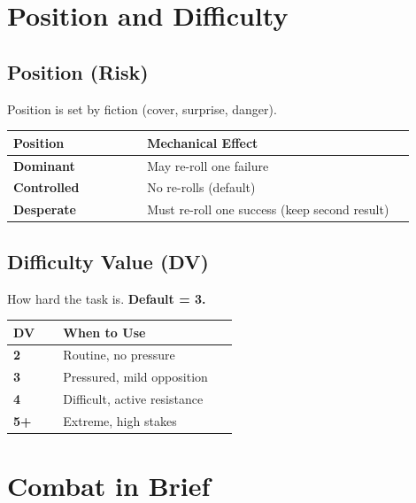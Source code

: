 \documentclass[10pt,twocolumn]{article}
\begin{document}
\section{Position and Difficulty}

\subsection{Position (Risk)}
Position is set by fiction (cover, surprise, danger).

\begin{coretable}
\begin{tabular}{>{\bfseries}p{0.3\linewidth} p{0.6\linewidth}}
\toprule
\textbf{Position} & \textbf{Mechanical Effect} \\
\midrule
Dominant & May re-roll one failure \\
Controlled & No re-rolls (default) \\
Desperate & Must re-roll one success (keep second result) \\
\bottomrule
\end{tabular}
\end{coretable}

\subsection{Difficulty Value (DV)}
How hard the task is. \textbf{Default = 3.}

\begin{coretable}
\begin{tabular}{>{\bfseries}p{0.2\linewidth} p{0.7\linewidth}}
\toprule
\textbf{DV} & \textbf{When to Use} \\
\midrule
2 & Routine, no pressure \\
3 & Pressured, mild opposition \\
4 & Difficult, active resistance \\
5+ & Extreme, high stakes \\
\bottomrule
\end{tabular}
\end{coretable}

\section{Combat in Brief}
\end{document}
